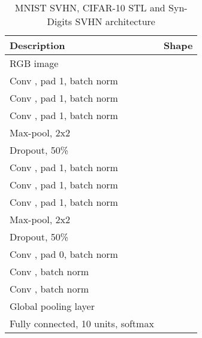 \documentclass{article}
\begin{document}
\begin{table}[h!t]
\footnotesize
\begin{center}
\begin{tabular}{|ll|}
\hline
\multicolumn{1}{|l|}{Description} &
Shape \\
\hline
 RGB image                          &       \\

Conv , pad 1, batch norm   &     \\
Conv , pad 1, batch norm   &     \\
Conv , pad 1, batch norm   &     \\
Max-pool, 2x2                                     &     \\
Dropout, 50\%                                     &     \\

Conv , pad 1, batch norm   &     \\
Conv , pad 1, batch norm   &     \\
Conv , pad 1, batch norm   &     \\
Max-pool, 2x2                                     &       \\
Dropout, 50\%                                     &       \\

Conv , pad 0, batch norm   &       \\
Conv , batch norm          &       \\
Conv , batch norm          &       \\

Global pooling layer                              &       \\

Fully connected, 10 units, softmax                &                          \\

\hline
\end{tabular}
\caption{MNIST  SVHN, CIFAR-10  STL and Syn-Digits  SVHN architecture}
\label{tab:arch_cifar_stl_syndigits_svhn}
\end{center}
\end{table}
\end{document}
